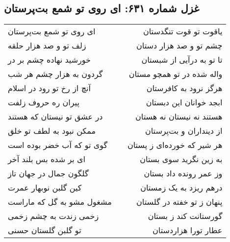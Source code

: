 \begin{center}
\section*{غزل شماره ۶۳۱: ای روی تو شمع بت‌پرستان}
\label{sec:631}
\begin{longtable}{l p{0.5cm} r}
ای روی تو شمع بت‌پرستان
&&
یاقوت تو قوت تنگدستان
\\
زلف تو و صد هزار حلقه
&&
چشم تو و صد هزار دستان
\\
خورشید نهاده چشم بر در
&&
تا تو به درآیی از شبستان
\\
گردون به هزار چشم هر شب
&&
واله شده در تو همچو مستان
\\
آنچ از رخ تو رود در اسلام
&&
هرگز نرود به کافرستان
\\
پیران ره حروف زلفت
&&
ابجد خوانان این دبستان
\\
در عشق تو نیستان که هستند
&&
هستند نه نیستان نه هستان
\\
ممکن نبود به لطف تو خلق
&&
از دینداران و بت‌پرستان
\\
گوی تو که آب خضر بوده است
&&
هر شیر که خورده‌ای ز پستان
\\
ای بر شده بس بلند آخر
&&
به زین نگرید سوی بستان
\\
گلگون جمال در جهان تاز
&&
وز عمر رونده داد بستان
\\
کین گلبن نوبهار عمرت
&&
درهم ریزد به یک زمستان
\\
مشغول مشو به گل که ماراست
&&
پنهان ز تو خفته در گلستان
\\
زخمی زندت به چشم زخمی
&&
گورستانت کند ز بستان
\\
تو گلبن گلستان حسنی
&&
عطار تورا هزاردستان
\\
\end{longtable}
\end{center}
